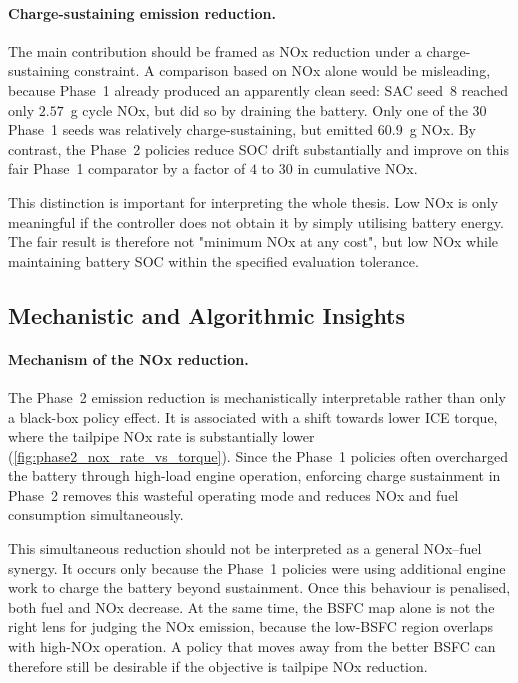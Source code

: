 \paragraph{Charge-sustaining emission reduction.}
The main contribution should be framed as \ac{NOx} reduction under a charge-sustaining constraint. A comparison based on \ac{NOx} alone would be misleading, because Phase~1 already produced an apparently clean seed: SAC seed~8 reached only $2.57$~g cycle \ac{NOx}, but did so by draining the battery. Only one of the 30 Phase~1 seeds was relatively charge-sustaining, but emitted $60.9$~g \ac{NOx}. By contrast, the Phase~2 policies reduce \ac{SOC} drift substantially and improve on this fair Phase~1 comparator by a factor of $4$ to $30$ in cumulative \ac{NOx}.

This distinction is important for interpreting the whole thesis. Low \ac{NOx} is only meaningful if the controller does not obtain it by simply utilising battery energy. The fair result is therefore not "minimum \ac{NOx} at any cost", but low \ac{NOx} while maintaining battery \ac{SOC} within the specified evaluation tolerance.

\subsection{Mechanistic and Algorithmic Insights}

\paragraph{Mechanism of the \ac{NOx} reduction.}
The Phase~2 emission reduction is mechanistically interpretable rather than only a black-box policy effect. It is associated with a shift towards lower \ac{ICE} torque, where the tailpipe \ac{NOx} rate is substantially lower (\autoref{fig:phase2_nox_rate_vs_torque}). Since the Phase~1 policies often overcharged the battery through high-load engine operation, enforcing charge sustainment in Phase~2 removes this wasteful operating mode and reduces \ac{NOx} and fuel consumption simultaneously.

This simultaneous reduction should not be interpreted as a general \ac{NOx}--fuel synergy. It occurs only because the Phase~1 policies were using additional engine work to charge the battery beyond sustainment. Once this behaviour is penalised, both fuel and \ac{NOx} decrease. At the same time, the \ac{BSFC} map alone is not the right lens for judging the \ac{NOx} emission, because the low-\ac{BSFC} region overlaps with high-\ac{NOx} operation. A policy that moves away from the better \ac{BSFC} can therefore still be desirable if the objective is tailpipe \ac{NOx} reduction.

